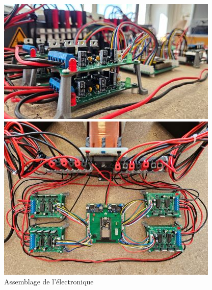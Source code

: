 \documentclass{article}
\begin{document}
\begin{figure}[H]
    \centering
    \begin{minipage}{0.45\textwidth}
    \centering
        \includegraphics[width=\linewidth, angle=0]{Images/photoFabrications/final (2).jpg}
    \end{minipage}\hfill
    \begin{minipage}{0.45\textwidth}
        \centering
        \includegraphics[width=\linewidth, angle=0]{Images/photoFabrications/final.jpg}
        
    \end{minipage}
    \caption{Assemblage de l'électronique}
    \label{fig:assemblage2}
\end{figure}
\end{document}
